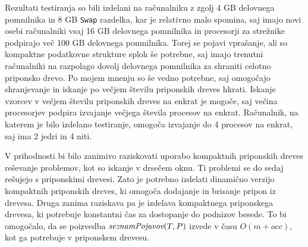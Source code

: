 Rezultati testiranja so bili izdelani na računalniku z zgolj 4 GB delovnega pomnilnika in 8 GB \verb|Swap| razdelka, kar je relativno malo spomina, saj imajo novi osebi računalniki vsaj 16 GB delovnega pomnilnika in procesorji za strežnike podpirajo več 100 GB delovnega pomnilnika. Torej se pojavi vprašanje, ali so kompaktne podatkovne strukture sploh še potrebne, saj imajo trenutni računalniki na razpolago dovolj delovnega pomnilnika za shraniti celotno priponsko drevo. Po mojem mnenju so še vedno potrebne, saj omogočajo shranjevanje in iskanje po večjem številu priponskih dreves hkrati. Iskanje vzorcev v večjem številu priponskih dreves na enkrat je mogoče, saj večina procesorjev podpira izvajanje večjega števila procesov na enkrat. Računalnik, na katerem je bilo izdelano testiranje, omogoča izvajanje do 4 procesov na enkrat, saj ima 2 jedri in 4 niti.


V prihodnosti bi bilo zanimivo raziskovati uporabo kompaktnih priponskih dreves reševanje problemov, kot so iskanje v drsečem oknu. Ti problemi se do sedaj rešujejo s priponskimi drevesi. Zato je potrebno izdelati dinamično verzijo kompaktnih priponskih dreves, ki omogoča dodajanje in brisanje pripon iz drevesa. Druga zanima raziskava pa je izdelava kompaktnega priponskega drevesa, ki potrebuje konstantni čas za dostopanje do podnizov besede. To bi omogočalo, da se poizvedba $ \mathop{\textit{seznamPojavov}}(T,P) $ izvede v času $O(m+occ)$, kot ga potrebuje v priponskem drevesu.